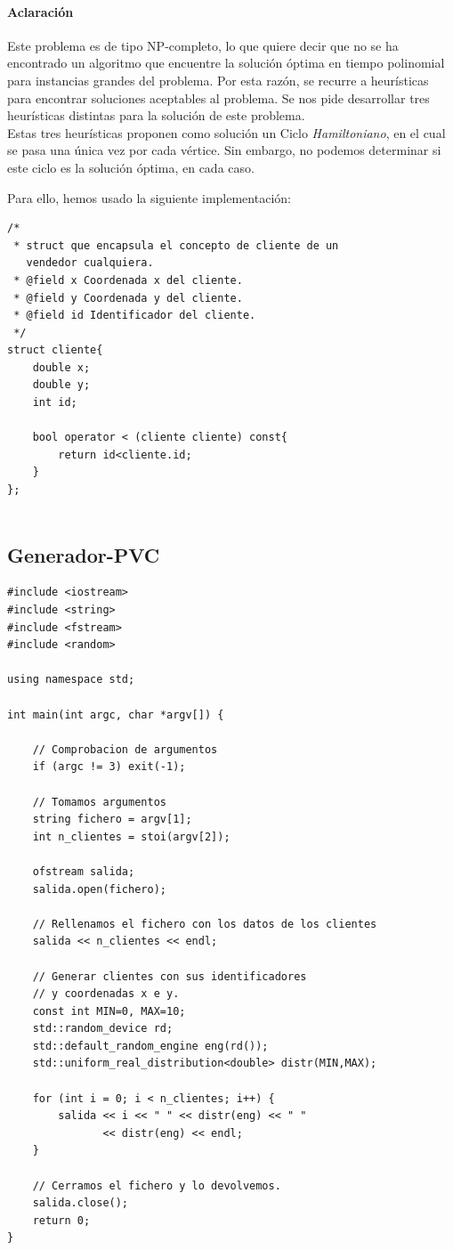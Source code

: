\documentclass[a4paper,12pt,twoside]{article} %
\begin{document}
\paragraph{Aclaración}
Este problema es de tipo NP-completo, lo que quiere decir que no se ha encontrado un algoritmo que encuentre la solución óptima en tiempo polinomial para instancias grandes del problema. Por esta razón, se recurre a heurísticas para encontrar soluciones aceptables al problema. Se nos pide desarrollar tres heurísticas distintas para la solución de este problema.\\

Estas tres heurísticas proponen como solución un Ciclo \textit{Hamiltoniano}, en el cual se pasa una única vez por cada vértice. Sin embargo, no podemos determinar si este ciclo es la solución óptima, en cada caso.

Para ello, hemos usado la siguiente implementación:\\

\lstset{language=C++}
\begin{lstlisting}
/*
 * struct que encapsula el concepto de cliente de un 
   vendedor cualquiera.
 * @field x Coordenada x del cliente.
 * @field y Coordenada y del cliente.
 * @field id Identificador del cliente.
 */
struct cliente{
    double x;
    double y;
    int id;

    bool operator < (cliente cliente) const{
        return id<cliente.id;
    }
};


\end{lstlisting}
\newpage

\subsection{Generador-PVC}
\lstset{language=C++}
\begin{lstlisting}
#include <iostream>
#include <string>
#include <fstream>
#include <random>

using namespace std;

int main(int argc, char *argv[]) {

    // Comprobacion de argumentos
    if (argc != 3) exit(-1);

    // Tomamos argumentos
    string fichero = argv[1];
    int n_clientes = stoi(argv[2]);

    ofstream salida;
    salida.open(fichero);

    // Rellenamos el fichero con los datos de los clientes
    salida << n_clientes << endl;

    // Generar clientes con sus identificadores 
    // y coordenadas x e y.
    const int MIN=0, MAX=10;
    std::random_device rd;
    std::default_random_engine eng(rd());
    std::uniform_real_distribution<double> distr(MIN,MAX);

    for (int i = 0; i < n_clientes; i++) {
        salida << i << " " << distr(eng) << " " 
               << distr(eng) << endl;
    }

    // Cerramos el fichero y lo devolvemos.
    salida.close();
    return 0;
}

\end{lstlisting}
\end{document}
